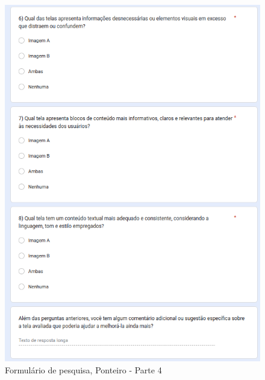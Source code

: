\begin{figure}[!h]
	\begin{center}
	    \includegraphics[scale=0.6]{figs/Form/22.png}
	\end{center}
	\caption{\label{AP_PonP04}Formulário de pesquisa, Ponteiro - Parte 4}
\end{figure}
